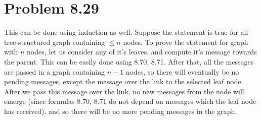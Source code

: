 \documentclass[fleqn]{article}
\begin{document}
\section*{Problem 8.29}
This can be done using induction as well. Suppose the statement is true for all tree-structured graph containing $\le n$ nodes. To prove the statement for graph with $n$ nodes, let us consider any of it's leaves, and compute it's message towards the parent. This can be easily done using 8.70, 8.71. After that, all the messages are passed in a graph containing $n-1$ nodes, so there will eventually be no pending messages, except the message over the link to the selected leaf node. After we pass this message over the link, no new messages from the node will emerge (since formulas 8.70, 8.71 do not depend on messages which the leaf node has received), and so there will be no more pending messages in the graph.
\end{document}
